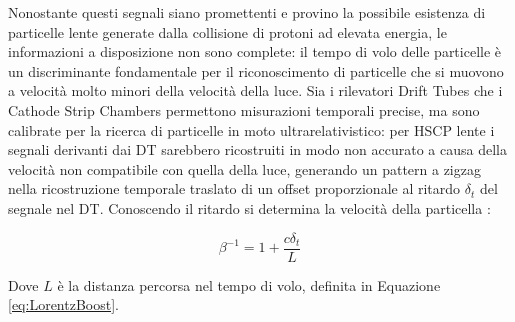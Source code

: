 
Nonostante questi segnali siano promettenti e provino la possibile esistenza di particelle lente generate dalla collisione di protoni ad elevata energia, le informazioni a disposizione non sono complete: il tempo di volo delle particelle è un discriminante fondamentale per il riconoscimento di particelle che si muovono a velocità molto minori della velocità della luce. Sia i rilevatori Drift Tubes che i Cathode Strip Chambers permettono misurazioni temporali precise, ma sono calibrate per la ricerca di particelle in moto ultrarelativistico: per HSCP lente i segnali derivanti dai DT sarebbero ricostruiti in modo non accurato a causa della velocità non compatibile con quella della luce, generando un pattern a zigzag nella ricostruzione temporale traslato di un offset proporzionale al ritardo $\delta_t$ del segnale nel DT. Conoscendo il ritardo si determina la velocità della particella \cite{CMS-PAS-EXO-16-036}:

\begin{equation}
  \label{eq:Velocity}
  \beta^{-1} = 1 + \frac{c\delta_t}{L}
\end{equation}

Dove $L$ è la distanza percorsa nel tempo di volo, definita in Equazione \ref{eq:LorentzBoost}.

